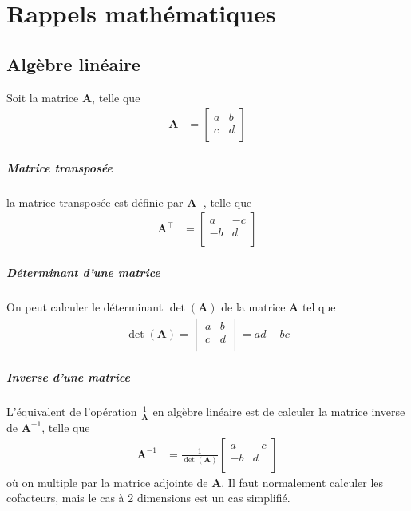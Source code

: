 \documentclass[12pt, french]{report}
\begin{document}
\chapter{Rappels mathématiques}
\section{Algèbre linéaire}
\label{annexe:algebre-lineaire}
Soit la matrice $\bm{A}$, telle que
\begin{align*}
\bm{A}	& = 
\begin{bmatrix}
a	& b \\
c	& d \\
\end{bmatrix}
\end{align*}
\paragraph{Matrice transposée} la matrice transposée est définie par $\bm{A}^\top$, telle que
\begin{align*}
\bm{A}^{\top} & = 
\begin{bmatrix}
a	& -c \\
-b	& d \\
\end{bmatrix}
\end{align*}

\paragraph{Déterminant d'une matrice} On peut calculer le déterminant $\det(\bm{A})$ de la matrice $\bm{A}$ tel que
\begin{align*}
\det(\bm{A})	  = 
\begin{vmatrix}
a	& b \\
c	& d \\
\end{vmatrix}
= ad - bc
\end{align*}

\paragraph{Inverse d'une matrice} L'équivalent de l'opération $\frac{1}{\bm{A}}$ en algèbre linéaire est de calculer la matrice inverse de $\bm{A}^{-1}$, telle que
\begin{align*}
\bm{A}^{-1}	& = \frac{1}{\det(\bm{A})}
\begin{bmatrix}
a	& -c \\
-b	& d \\
\end{bmatrix}
\end{align*}
où on multiple par la matrice adjointe de $\bm{A}$. Il faut normalement calculer les cofacteurs, mais le cas à 2 dimensions est un cas simplifié.
\end{document}
